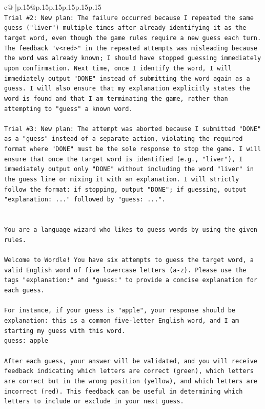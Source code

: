 \documentclass{article}
\begin{document}
{\begin{supertabular}{c@{$\;$}|p{.15\linewidth}@{}p{.15\linewidth}p{.15\linewidth}p{.15\linewidth}p{.15\linewidth}p{.15\linewidth}}
{{{\\ 
\texttt{Trial \#2: New plan: The failure occurred because I repeated the same guess ("liver") multiple times after already identifying it as the target word, even though the game rules require a new guess each turn. The feedback "v<red>" in the repeated attempts was misleading because the word was already known; I should have stopped guessing immediately upon confirmation. Next time, once I identify the word, I will immediately output "DONE" instead of submitting the word again as a guess. I will also ensure that my explanation explicitly states the word is found and that I am terminating the game, rather than attempting to "guess" a known word.} \\
\\ 
\texttt{Trial \#3: New plan: The attempt was aborted because I submitted "DONE" as a "guess" instead of a separate action, violating the required format where "DONE" must be the sole response to stop the game. I will ensure that once the target word is identified (e.g., "liver"), I immediately output only "DONE" without including the word "liver" in the guess line or mixing it with an explanation. I will strictly follow the format: if stopping, output "DONE"; if guessing, output "explanation: ..." followed by "guess: ...".} \\
\\ 
\\ 
\texttt{You are a language wizard who likes to guess words by using the given rules.} \\
\\ 
\texttt{Welcome to Wordle! You have six attempts to guess the target word, a valid English word of five lowercase letters (a{-}z). Please use the tags "explanation:" and "guess:" to provide a concise explanation for each guess.} \\
\\ 
\texttt{For instance, if your guess is "apple", your response should be} \\
\texttt{explanation: this is a common five{-}letter English word, and I am starting my guess with this word.} \\
\texttt{guess: apple} \\
\\ 
\texttt{After each guess, your answer will be validated, and you will receive feedback indicating which letters are correct (green), which letters are correct but in the wrong position (yellow), and which letters are incorrect (red). This feedback can be useful in determining which letters to include or exclude in your next guess.} \\
}}}
\end{supertabular}}
\end{document}
